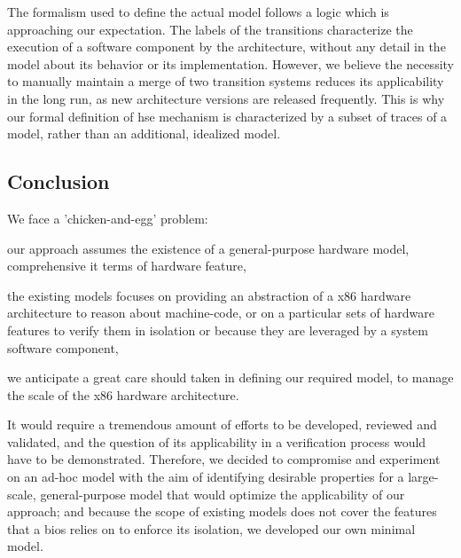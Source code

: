 %
The formalism used to define the actual model follows a logic which is
approaching our expectation.
%
The labels of the transitions characterize the execution of a software component
by the architecture, without any detail in the model about its behavior or its
implementation.
%
However, we believe the necessity to manually maintain a merge of two transition
systems reduces its applicability in the long run, as new architecture versions
are released frequently.
%
This is why our formal definition of \ac{hse} mechanism is characterized by a
subset of traces of a model, rather than an additional, idealized model.
%

\subsection{Conclusion}
\label{subsec:sota:ltsconclusion}

We face a 'chicken-and-egg' problem:
%
\begin{inparaenum}[(1)]
\item our approach assumes the existence of a general-purpose hardware model,
  comprehensive it terms of hardware feature,
\item the existing models focuses on providing an abstraction of a x86 hardware
  architecture to reason about machine-code, or on a particular sets of hardware
  features to verify them in isolation or because they are leveraged by a system
  software component,
\item we anticipate a great care should taken in defining our required model, to
  manage the scale of the x86 hardware architecture.
\end{inparaenum}
%
It would require a tremendous amount of efforts to be developed, reviewed and
validated, and the question of its applicability in a verification process would
have to be demonstrated.
%
Therefore, we decided to compromise and experiment on an ad-hoc model with the
aim of identifying desirable properties for a large-scale, general-purpose model
that would optimize the applicability of our approach; and because the scope of
existing models does not cover the features that a \ac{bios} relies on to
enforce its isolation, we developed our own minimal model.
%
%

